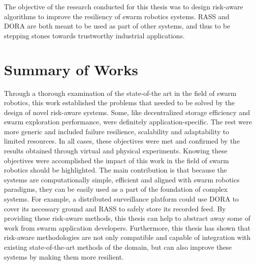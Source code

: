 \label{sec:Conclusion}
The objective of the research conducted for this thesis was to design risk-aware algorithms to improve the resiliency of swarm robotics systems. RASS and DORA are both meant to be used as part of other systems, and thus to be stepping stones towards trustworthy industrial applications.

\section{Summary of Works}
Through a thorough examination of the state-of-the art in the field of swarm robotics, this work established the problems that needed to be solved by the design of novel risk-aware systems. Some, like decentralized storage efficiency and swarm exploration performance, were definitely application-specific. The rest were more generic and included failure resilience, scalability and adaptability to limited resources. In all cases, these objectives were met and confirmed by the results obtained through virtual and physical experiments. Knowing these objectives were accomplished the impact of this work in the field of swarm robotics should be highlighted. The main contribution is that because the systems are computationally simple, efficient and aligned with swarm robotics paradigms, they can be easily used as a part of the foundation of complex systems. For example, a distributed surveillance platform could use \ac{DORA} to cover its necessary ground and \ac{RASS} to safely store its recorded feed. By providing these risk-aware methods, this thesis can help to abstract away some of work from swarm application developers. Furthermore, this thesis has shown that risk-aware methodologies are not only compatible and capable of integration with existing state-of-the-art methods of the domain, but can also improve these systems by making them more resilient.

